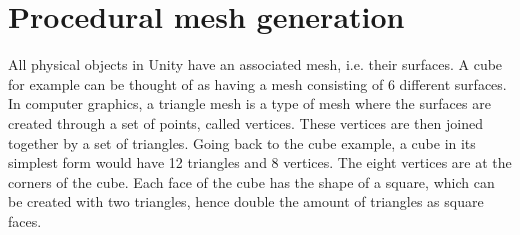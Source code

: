 \section{Procedural mesh generation}
    All physical objects in Unity have an associated mesh, i.e. their surfaces. A cube for example can be thought of as having a mesh consisting of 6 different surfaces. In computer graphics, a triangle mesh is a type of mesh where the surfaces are created through a set of points, called vertices. These vertices are then joined together by a set of triangles. Going back to the cube example, a cube in its simplest form would have 12 triangles and 8 vertices. The eight vertices are at the corners of the cube. Each face of the cube has the shape of a square, which can be created with two triangles, hence double the amount of triangles as square faces.

    
